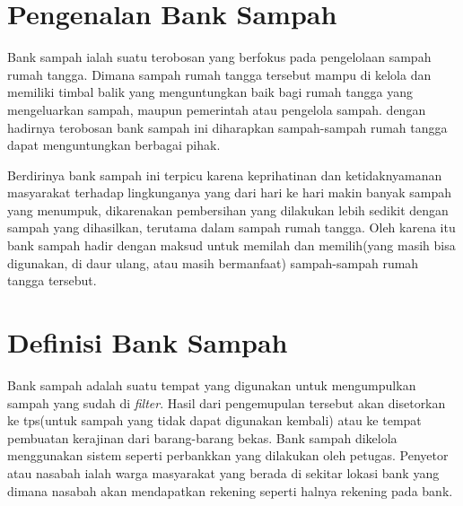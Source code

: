 \section{Pengenalan Bank Sampah}
Bank sampah ialah suatu terobosan yang berfokus pada pengelolaan sampah rumah tangga. Dimana sampah rumah tangga tersebut mampu di kelola dan memiliki timbal balik yang menguntungkan baik bagi rumah tangga yang mengeluarkan sampah, maupun pemerintah atau pengelola sampah. dengan hadirnya terobosan bank sampah ini diharapkan sampah-sampah rumah tangga dapat menguntungkan berbagai pihak. 

Berdirinya bank sampah ini terpicu karena keprihatinan dan ketidaknyamanan masyarakat terhadap lingkunganya yang dari hari ke hari makin banyak sampah yang menumpuk, dikarenakan pembersihan yang dilakukan lebih sedikit dengan sampah yang dihasilkan, terutama dalam sampah rumah tangga. Oleh karena itu bank sampah hadir dengan maksud untuk memilah dan memilih(yang masih bisa digunakan, di daur ulang, atau masih bermanfaat) sampah-sampah rumah tangga tersebut.

\section{Definisi Bank Sampah}
Bank sampah adalah suatu tempat yang digunakan untuk mengumpulkan sampah yang sudah di \textit{filter}. Hasil dari pengemupulan tersebut akan disetorkan ke tps(untuk sampah yang tidak dapat digunakan kembali) atau ke tempat pembuatan kerajinan dari barang-barang bekas. Bank sampah dikelola menggunakan sistem seperti perbankkan yang dilakukan oleh petugas. Penyetor atau nasabah ialah warga masyarakat yang berada di sekitar lokasi bank yang dimana nasabah akan mendapatkan rekening seperti halnya rekening pada bank.\cite{1}
